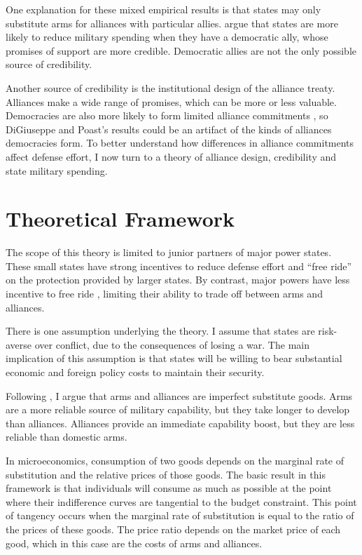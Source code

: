 \documentclass[12pt]{article}
\begin{document}
One explanation for these mixed empirical results is that states may only substitute arms for alliances with particular allies. \citet{DigiuseppePoast2016} argue that states are more likely to reduce military spending when they have a democratic ally, whose promises of support are more credible. Democratic allies are not the only possible source of credibility. 

Another source of credibility is the institutional design of the alliance treaty. Alliances make a wide range of promises, which can be more or less valuable. Democracies are also more likely to form limited alliance commitments \citep{Chibaetal2015}, so DiGiuseppe and Poast's results could be an artifact of the kinds of alliances democracies form. To better understand how differences in alliance commitments affect defense effort, I now turn to a theory of alliance design, credibility and state military spending. 


\section*{Theoretical Framework} 

The scope of this theory is limited to junior partners of major power states. These small states have strong incentives to reduce defense effort and ``free ride'' on the protection provided by larger states. By contrast, major powers have less incentive to free ride \citep{OlsonZeckhauser1966}, limiting their ability to trade off between arms and alliances. 

There is one assumption underlying the theory. I assume that states are risk-averse over conflict, due to the consequences of losing a war. The main implication of this assumption is that states will be willing to bear substantial economic and foreign policy costs to maintain their security. 

Following \citet{Morrow1993}, I argue that arms and alliances are imperfect substitute goods. Arms are a more reliable source of military capability, but they take longer to develop than alliances. Alliances provide an immediate capability boost, but they are less reliable than domestic arms. 

In microeconomics, consumption of two goods depends on the marginal rate of substitution and the relative prices of those goods. The basic result in this framework is that individuals will consume as much as possible at the point where their indifference curves are tangential to the budget constraint. This point of tangency occurs when the marginal rate of substitution is equal to the ratio of the prices of these goods. The price ratio depends on the market price of each good, which in this case are the costs of arms and alliances. 
\end{document}
